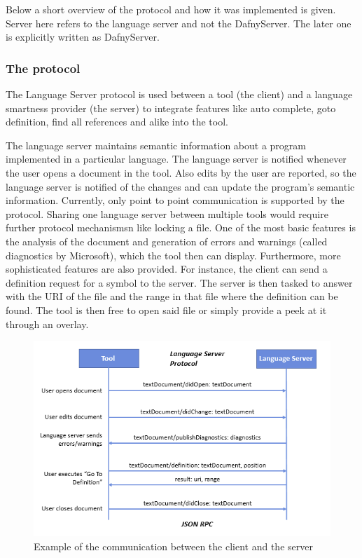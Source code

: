 Below a short overview of the protocol and how it was implemented is given. Server here refers to the language server and not the DafnyServer. The later one is explicitly written as DafnyServer.

\subsubsection{The protocol}
The Language Server protocol is used between a tool (the client) and a language smartness provider (the server) to integrate features like auto complete, goto definition, find all references and alike into the tool. \cite{langserver} \newline

The language server maintains semantic information about a program implemented in a particular language. The language server is notified whenever the user opens a document in the tool. Also edits by the user are reported, so the language server is notified of the changes and can update the program's semantic information. Currently, only point to point communication is supported by the protocol. Sharing one language server between multiple tools would require further protocol mechanismsn like locking a file.\newline
One of the most basic features is the analysis of the document and generation of errors and warnings (called diagnostics by Microsoft), which the tool then can display. Furthermore, more sophisticated features are also provided. For instance, the client can send a definition request for a symbol to the server. The server is then tasked to answer with the URI of the file and the range in that file where the definition can be found. The tool is then free to open said file or simply provide a peek at it through an overlay. \newline

\begin{figure}[H]
	\centering
	\includegraphics[width=1\textwidth]{img/langServerOverview}
	\caption{Example of the communication between the client and the server}
	\label{fig:langserveroverview}
\end{figure}


